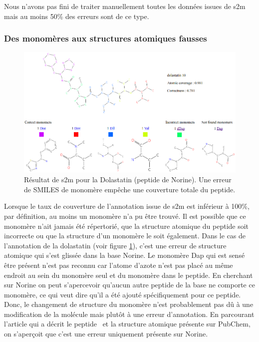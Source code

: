 Nous n'avons pas fini de traiter manuellement toutes les données issues de s2m mais au moins 50\% des erreurs sont de ce type.


\subsubsection{Des monomères aux structures atomiques fausses}

\label{dolastatin_p}

\begin{figure}[h!]
  \begin{center}
    \includegraphics[width=450px]{Figures/s2m/results/dolastatin.png}
    \caption{\label{dolas}Résultat de s2m pour la Dolastatin (peptide de Norine).
    Une erreur de SMILES de monomère empêche une couverture totale du peptide.}
  \end{center}
\end{figure}

Lorsque le taux de couverture de l'annotation issue de s2m est inférieur à 100\%, par définition, au moins un monomère n'a pu être trouvé.
Il est possible que ce monomère n'ait jamais été répertorié, que la structure atomique du peptide soit incorrecte ou que la structure d'un monomère le soit également.
Dans le cas de l'annotation de la dolastatin (voir figure \ref{dolas}), c'est une erreur de structure atomique qui s'est glissée dans la base Norine.
Le monomère Dap qui est sensé être présent n'est pas reconnu car l'atome d'azote n'est pas placé au même endroit au sein du monomère seul et du monomère dans le peptide.
En cherchant sur Norine on peut s'apercevoir qu'aucun autre peptide de la base ne comporte ce monomère, ce qui veut dire qu'il a été ajouté spécifiquement pour ce peptide.
Donc, le changement de structure du monomère n'est probablement pas dû à une modification de la molécule mais plutôt à une erreur d'annotation.
En parcourant l'article qui a décrit le peptide~\cite{luesch_isolation_2001} et la structure atomique présente sur PubChem, on s'aperçoit que c'est une erreur uniquement présente sur Norine.


